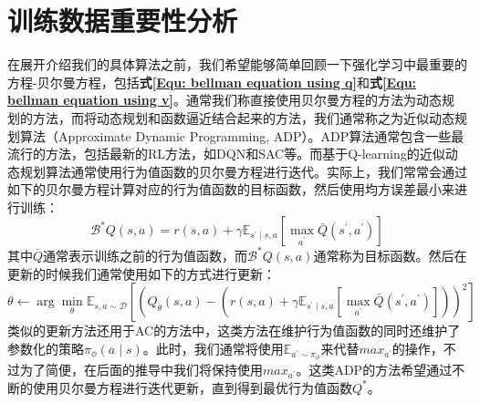 \section{训练数据重要性分析}
\label{sec: Training data importance analysis}
在展开介绍我们的具体算法之前，我们希望能够简单回顾一下强化学习中最重要的方程-贝尔曼方程，包括\textbf{式\eqref{Equ: bellman equation using q}}和\textbf{式\eqref{Equ: bellman equation using v}}。通常我们称直接使用贝尔曼方程的方法为动态规划的方法，而将动态规划和函数逼近结合起来的方法，我们通常称之为近似动态规划算法（Approximate Dynamic Programming, ADP）。ADP算法通常包含一些最流行的方法，包括最新的RL方法，如DQN和SAC等。而基于Q-learning的近似动态规划算法通常使用行为值函数的贝尔曼方程进行迭代。实际上，我们常常会通过如下的贝尔曼方程计算对应的行为值函数的目标函数，然后使用均方误差最小来进行训练：
\begin{equation}
    \mathcal{B}^{*} Q(s, a)=r(s, a)+\gamma \mathbb{E}_{s^{\prime} \mid s, a}\left[\max _{a^{\prime}} \bar{Q}\left(s^{\prime}, a^{\prime}\right)\right]
\end{equation}
其中$\bar{Q}$通常表示训练之前的行为值函数，而$\mathcal{B}^{*} Q(s, a)$通常称为目标函数。然后在更新的时候我们通常使用如下的方式进行更新：
\begin{equation}
    \theta \leftarrow \arg \min _{\theta} \mathbb{E}_{s, a \sim \mathcal{D}}\left[\left(Q_{\theta}(s, a)-\left(r(s, a)+\gamma \mathbb{E}_{s^{\prime} \mid s, a}\left[\max _{a^{\prime}} \bar{Q}\left(s^{\prime}, a^{\prime}\right)\right]\right)\right)^{2}\right]
\end{equation}
类似的更新方法还用于AC的方法中，这类方法在维护行为值函数的同时还维护了参数化的策略$\pi_{\phi}(a \mid s)$。此时，我们通常将使用$\mathbb{E}_{a^{\prime} \sim \pi_{\phi}}$来代替$max_{a^\prime}$的操作，不过为了简便，在后面的推导中我们将保持使用$max_{a^{\prime}}$。这类ADP的方法希望通过不断的使用贝尔曼方程进行迭代更新，直到得到最优行为值函数$Q^*$。

